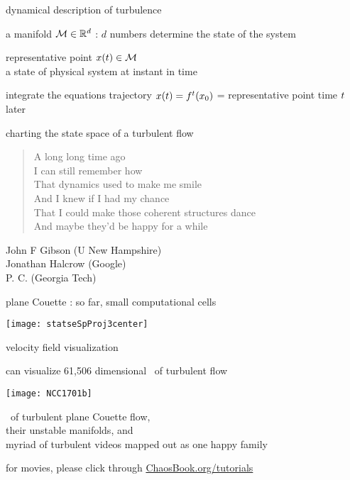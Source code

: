 \begin{frame}{dynamical description of turbulence}

\begin{block}{\statesp}
a manifold $\mathcal{M} \in \mathbb{R}^{d}$ :
$d$ numbers determine the state of the system
\end{block}

\bigskip

\begin{block}{representative point }
$x(t) \in \mathcal{M}$
\\
a state of physical system at instant in time
\end{block}

\bigskip

\begin{block}{integrate the equations}
trajectory $x(t) = {f^{t}({x_0})}$ =
representative point time $t$ later
\end{block}
\end{frame}

\begin{frame}{charting the state space of a turbulent flow}

\begin{quote}{\scriptsize
  A long long time ago\\
I can still remember how\\
That dynamics used to make me smile\\
And I knew if I had my chance\\
That I could make those coherent structures dance\\
And maybe they'd be happy for a while
            }
\end{quote}

\vfill

John F Gibson (U New Hampshire)
\\
Jonathan Halcrow (Google)
\\
P. C. (Georgia Tech)
\end{frame}

\begin{frame}{plane Couette : so far, {\Huge small} computational cells}
\begin{center}
\texttt{[image: statseSpProj3center]}
\end{center}
velocity field visualization
\end{frame}

\begin{frame}{can visualize 61,506 dimensional \statesp\ of turbulent flow}
\begin{center}
\texttt{[image: NCC1701b]}
\end{center}
\eqva\ of turbulent plane Couette flow,
\\
their unstable manifolds, and
\\
myriad of turbulent videos mapped out as one happy family

\bigskip

\hfill   {\small
          for movies, please click through
            \textcolor{blue}{\href{http://ChaosBook.org/tutorials}
             {ChaosBook.org/tutorials}}
          }
\end{frame}

